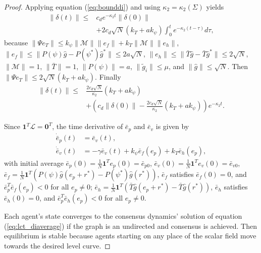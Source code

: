 \begin{proof}
Applying equation (\ref{eq:bounddi}) and using  $\kappa_2 = \kappa_2(\Sigma)$ yields
\begin{align*}
\|\delta(t)\| \leq & c_d e^{ -\kappa_2 t} \| \delta(0)\| \nonumber \\
    & +2  c_d \sqrt{N}(k_T+ ak_{\psi})  \int^{t}_{0} e^{ -\kappa_2 (t-\tau)} d\tau,
\end{align*}
because 
$\|\Psi e_T\|\leq k_{\psi}\|\mathcal{M}\|\|e_f\|+k_T\|\mathcal{M}\|\|e_h\|$, 
 $\|e_f\|\leq \|P(\psi)\hat{g}- P(\psi^*)\hat{g}^*\| \leq 2a\sqrt{N}$, 
 $\|e_h\|\leq \|\bar{T}\hat{g}- \bar{T}\hat{g}^*\| \leq 2 \sqrt{N}$,
 $\|\mathcal{M}\|=1$,  
 $\|\bar{T}\|=1$,
 $\|P(\psi)\|=a$,
$\| \tilde{g}_i \| \leq \mu$, 
and $\| \hat{g} \| \leq \sqrt{N}$.  
Then 
$\|\Psi e_T\| \leq 2 \sqrt{N} (k_T+ ak_{\psi})$.
Finally 
\begin{align}
\|\delta(t)\| \leq & \frac{2 c_d \sqrt{N}}{\kappa_2}(k_T+ak_{\psi}) \nonumber \\
& + \left( c_d\|\delta(0)\| - \frac{2 c_d\sqrt{N}}{\kappa_2} (k_T+ak_{\psi}) \right) e^{-\kappa_2 t}.
\end{align}

Since $\boldsymbol{1}^T\mathcal{L}=\boldsymbol{0}^T$, the time derivative of $\bar{e}_p$ and $\bar{e}_v$ is given by 
\begin{align}\label{eq:lct_diaverage}
\dot{\bar{e}}_p(t) & = \bar{e}_v(t), \nonumber\\
\dot{\bar{e}}_v(t) & = -\gamma \bar{e}_v(t) + k_{\psi}\bar{e}_f(e_p)+ k_T\bar{e}_h(e_p),
\end{align}
with initial average $\bar{e}_p(0)=\frac{1}{N}\boldsymbol{1}^Te_p(0)=\bar{e}_{p0}$,  $\bar{e}_v(0)=\frac{1}{N}\boldsymbol{1}^Te_v(0)=\bar{e}_{v0}$,  
$\bar{e}_f=\frac{1}{N} \boldsymbol{1}^T \left(P(\psi) \hat{g}(e_p + r^*)-P(\psi^*)\hat{g}(r^*) \right)$, $\bar{e}_f$ satisfies $\bar{e}_f(0)=0$, and $\bar{e}_p^T \bar{e}_f(e_p) <0$ for all $e_p\neq 0$; %
$\bar{e}_h=\frac{1}{N} \boldsymbol{1}^T \left( \bar{T}\hat{g}(e_p + r^*)-\bar{T}\hat{g}(r^*) \right)$, $\bar{e}_h$ satisfies $\bar{e}_h(0)=0$, and $\bar{e}_p^T \bar{e}_h(e_p) <0$ for all $e_p\neq 0$. %

Each agent's state converges to the consensus dynamics' solution of equation (\ref{eq:lct_diaverage}) if the graph is an undirected  and  consensus is achieved.  
Then equilibrium is stable because agents starting on any place of the scalar field  move towards the desired level curve.


\end{proof}
